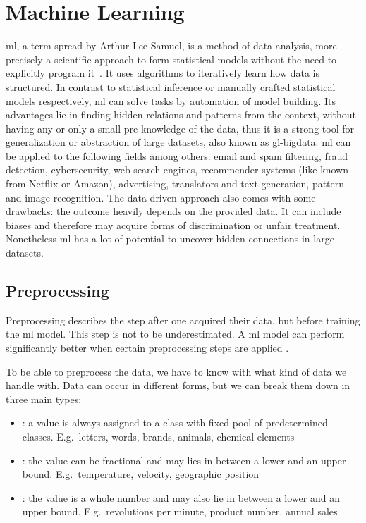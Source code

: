 \section{Machine Learning}
\label{sec:machine-learning}

\gls{ml}, a term spread by Arthur Lee Samuel, is a method of data analysis, more precisely a scientific approach to form statistical models without the need to explicitly program it~\cite{mahesh2020machine}.
It uses algorithms to iteratively learn how data is structured.
In contrast to statistical inference or manually crafted statistical models respectively, \gls{ml} can solve tasks by automation of model building.
Its advantages lie in finding hidden relations and patterns from the context, without having any or only a small pre knowledge of the data, thus it is a strong tool for generalization or abstraction of large datasets, also known as \gls{gl-bigdata}.
\gls{ml} can be applied to the following fields among others: email and spam filtering, fraud detection, cybersecurity, web search engines, recommender systems (like known from Netflix or Amazon), advertising, translators and text generation, pattern and image recognition.
The data driven approach also comes with some drawbacks: the outcome heavily depends on the provided data.
It can include biases and therefore may acquire forms of discrimination or unfair treatment.
Nonetheless \gls{ml} has a lot of potential to uncover hidden connections in large datasets.

\subsection{Preprocessing}

Preprocessing describes the step after one acquired their data, but before training the \gls{ml} model.
This step is not to be underestimated.
A \gls{ml} model can perform significantly better when certain preprocessing steps are applied \cite{alam2019impact}.

To be able to preprocess the data, we have to know with what kind of data we handle with.
Data can occur in different forms, but we can break them down in three main types:
\begin{itemize}
    \item {}: a value is always assigned to a class with fixed pool of predetermined classes.
          E.g.\ letters, words, brands, animals, chemical elements
    \item {}: the value can be fractional and may lies in between a lower and an upper bound.
          E.g.\ temperature, velocity, geographic position
    \item {}: the value is a whole number and may also lie in between a lower and an upper bound.
          E.g.\ revolutions per minute, product number, annual sales
\end{itemize}

